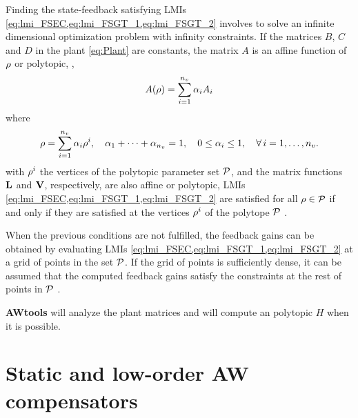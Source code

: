 \documentclass[fleqn,11pt]{article}
\newcommand{\awtool}{\textbf{AWtools}\xspace}
\begin{document}
Finding the state-feedback satisfying LMIs \cref{eq:lmi_FSEC,eq:lmi_FSGT_1,eq:lmi_FSGT_2} involves to solve an infinite dimensional optimization problem with infinity constraints. If the matrices $B$, $C$ and $D$ in the plant \cref{eq:Plant} are constants, the matrix $A$ is an affine function of $\rho$ or polytopic, \ie,
\begin{equation*}
      A(\rho) = \sum_{i=1}^{n_v}\alpha_i A_{i}
\end{equation*}
where
\begin{equation*}
    \rho = \sum_{i=1}^{n_v}\alpha_i\rho^i,\quad
    \alpha_1+\dots+\alpha_{n_v} = 1,\quad
    0\leq\alpha_i\leq1, \quad\forall\,i=1,\dots,n_v.
\end{equation*}
with $\rho^i$ the vertices of the polytopic parameter set $\mathcal{P}$, and the matrix functions $\mathbf{L}$ and $\mathbf{V}$, respectively, are also affine or polytopic, LMIs \cref{eq:lmi_FSEC,eq:lmi_FSGT_1,eq:lmi_FSGT_2} are satisfied for all $\rho\in\mathcal{P}$ if and only if they are satisfied at the vertices $\rho^i$ of the polytope $\mathcal{P}$ \cite{Apkarian1995}.

When the previous conditions are not fulfilled, the feedback gains can be obtained by evaluating LMIs \cref{eq:lmi_FSEC,eq:lmi_FSGT_1,eq:lmi_FSGT_2} at a grid of points in the set $\mathcal{P}$. If the grid of points is sufficiently dense, it can be assumed that the computed feedback gains satisfy the constraints at the rest of points in $\mathcal{P}$ \cite{Apkarian1998,Wu1996}.

\awtool will analyze the plant matrices and will compute an polytopic $H$ when it is possible.

\section{Static and low-order AW compensators}\label{eq:stat}
\end{document}
